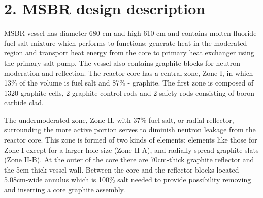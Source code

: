\documentclass{anstrans}
\begin{document}
\section{2. MSBR design description}
MSBR vessel has diameter 680 cm and high 610 cm and contains molten fluoride fuel-salt mixture which performs to functions: generate heat in the moderated region and transport heat energy from the core to primary heat exchanger using the primary salt pump. The vessel also contains graphite blocks for neutron moderation and reflection. The reactor core has a central zone, Zone I, in which 13\% of the volume is fuel salt and 87\% - graphite. The first zone is composed of 1320 graphite cells, 2 graphite control rods and 2 safety rods consisting of boron carbide clad. 

The undermoderated zone, Zone II, with 37\% fuel salt, or radial reflector, surrounding the more active portion serves to diminish neutron leakage from the reactor core. This zone is formed of two kinds of elements: elements like those for Zone I except for a larger hole size (Zone II-A), and radially spread graphite slats (Zone II-B). At the outer of the core there are 70cm-thick graphite reflector and the 5cm-thick vessel wall. Between the core and the reflector blocks located 5.08cm-wide annulus which is 100\% salt needed to provide possibility removing and inserting a core graphite assembly. 
\end{document}
